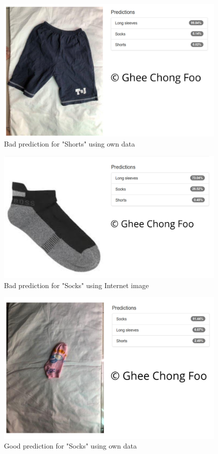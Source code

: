 \documentclass[10pt,journal,compsoc]{IEEEtran}
\begin{document}
\begin{figure}[thpb]
      \centering
      \includegraphics[width=\linewidth]{short_bad_predict2}
      \caption{Bad prediction for "Shorts" using own data}
      \label{fig:short_bad_predict2}
\end{figure}

\begin{figure}[thpb]
      \centering
      \includegraphics[width=\linewidth]{socks_bad_predict1}
      \caption{Bad prediction for "Socks" using Internet image}
      \label{fig:socks_bad_predict1}
\end{figure}

\begin{figure}[thpb]
      \centering
      \includegraphics[width=\linewidth]{socks_good_predict1}
      \caption{Good prediction for "Socks" using own data}
      \label{fig:socks_good_predict1}
\end{figure}
\end{document}
